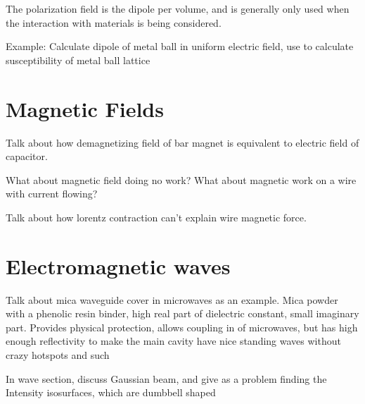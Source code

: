 \documentclass[12pt,a4paper,violet]{bbe}
\begin{document}
	The polarization field is the dipole per volume, and is generally only used when the interaction with materials is being considered.
	
	Example: Calculate dipole of metal ball in uniform electric field, use to calculate susceptibility of metal ball lattice
	

\chapter{Magnetic Fields}
	Talk about how demagnetizing field of bar magnet is equivalent to electric field of capacitor.

	What about magnetic field doing no work? What about magnetic work on a wire with current flowing?

	Talk about how lorentz contraction can't explain wire magnetic force.


\chapter{Electromagnetic waves}
	Talk about mica waveguide cover in microwaves as an example. Mica powder with a phenolic resin binder, high real part of dielectric constant, small imaginary part.
	Provides physical protection, allows coupling in of microwaves, but has high enough reflectivity to make the main cavity have nice standing waves without crazy hotspots and such
	

	In wave section, discuss Gaussian beam, and give as a problem finding the Intensity isosurfaces, which are dumbbell shaped

	\blinddocument
	
\end{document}
